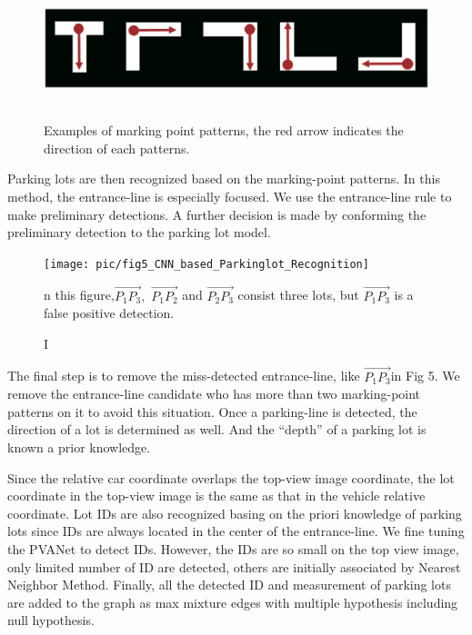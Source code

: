 \documentclass[journal]{IEEEtran}
\begin{document}
\begin{figure}
\centering
\includegraphics[height = 1.6in]{pic/fig4_CNN_based_Parkinglot_Recognition}
\caption{
Examples of marking point patterns, the red arrow indicates the direction of each patterns.\cite{Li2017Vision}
}\label{fig:4}
\end{figure}

Parking lots are then recognized based on the marking-point patterns. 
In this method, the entrance-line is especially focused. 
We use the entrance-line rule to make preliminary detections. 
A further decision is made by conforming the preliminary detection to the parking lot model.

\begin{figure}
\centering
\texttt{[image: pic/fig5\_CNN\_based\_Parkinglot\_Recognition]}
\caption
    In this figure,$\overrightarrow{{P}_{1}{P}_{3}},$ $\overrightarrow{{P}_{1}{P}_{2}}$ and $\overrightarrow{{P}_{2}{P}_{3}}$ consist three lots, but $\overrightarrow{{P}_{1}{P}_{3}}$ is a false positive detection.\citep{Li2017Vision}
\label{fig:5}
\end{figure}


The final step is to remove the miss-detected entrance-line, like $\overrightarrow{{P}_{1}{P}_{3}}$in Fig 5. 
We remove the entrance-line candidate who has more than two marking-point patterns on it to avoid this situation.  
Once a parking-line is detected, the direction of a lot is determined as well. And the “depth” of a parking lot is known a prior knowledge. 
	
Since the relative car coordinate overlaps the top-view image coordinate, the lot coordinate in the top-view image is the same as that in the vehicle relative coordinate. 
Lot IDs are also recognized basing on the priori knowledge of parking lots since IDs are always located in the center of the entrance-line. 
We fine tuning the PVANet\cite{Hong2016PVANet} to detect IDs. 
However, the IDs are so small on the top view image, only limited number of ID are detected, others are initially associated by Nearest Neighbor Method. 
Finally, all the detected ID and measurement of parking lots are added to the graph as max mixture \cite{Pfingsthorn2014Representing} edges with multiple hypothesis including null hypothesis.
\end{document}
